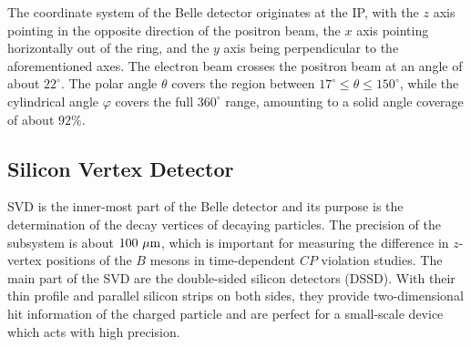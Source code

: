 The coordinate system of the Belle detector originates at the IP, with the $z$ axis pointing in the opposite direction of the positron beam, the $x$ axis pointing horizontally out of the ring, and the $y$ axis being perpendicular to the aforementioned axes. The electron beam crosses the positron beam at an angle of about $22^\circ$. The polar angle $\theta$ covers the region between $17^\circ \leq \theta \leq 150^\circ$, while the cylindrical angle $\varphi$ covers the full $360^\circ$ range, amounting to a solid angle coverage of about $92\%$.




\subsection{Silicon Vertex Detector}
SVD is the inner-most part of the Belle detector and its purpose is the determination of the decay vertices of decaying particles. The precision of the subsystem is about $100\mathrm{~\mu m}$, which is important for measuring the difference in $z$-vertex positions of the $B$ mesons in time-dependent $CP$ violation studies. The main part of the SVD are the double-sided silicon detectors (DSSD). With their thin profile and parallel silicon strips on both sides, they provide two-dimensional hit information of the charged particle and are perfect for a small-scale device which acts with high precision.

